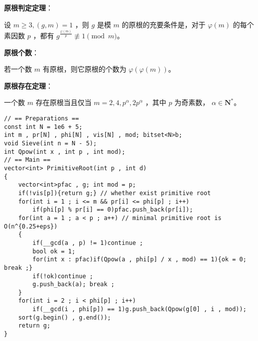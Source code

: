 \begin{tcolorbox}
\textbf{原根判定定理}：

设 $m \ge 3, (g,m)=1$ ，则 $g$ 是模 $m$ 的原根的充要条件是，对于 $\varphi(m)$ 的每个素因数 $p$ ，都有
$g^{\frac{\varphi(m)}{p}}\not\equiv 1\pmod m$。
\end{tcolorbox}


\begin{tcolorbox}
\textbf{原根个数}：

若一个数 $m$ 有原根，则它原根的个数为 $\varphi(\varphi(m))$。
\end{tcolorbox}


\begin{tcolorbox}
\textbf{原根存在定理}：

一个数 $m$ 存在原根当且仅当 $m=2,4,p^{\alpha},2p^{\alpha}$ ，其中 $p$ 为奇素数， $\alpha\in \mathbf{N}^{*}$。
\end{tcolorbox}

\begin{verbatim}
// == Preparations ==
const int N = 1e6 + 5; 
int m , pr[N] , phi[N] , vis[N] , mod; bitset<N>b;
void Sieve(int n = N - 5);
int Qpow(int x , int p , int mod);
// == Main ==
vector<int> PrimitiveRoot(int p , int d)
{
    vector<int>pfac , g; int mod = p;
    if(!vis[p]){return g;} // whether exist primitive root
    for(int i = 1 ; i <= m && pr[i] <= phi[p] ; i++)
        if(phi[p] % pr[i] == 0)pfac.push_back(pr[i]);
    for(int a = 1 ; a < p ; a++) // minimal primitive root is O(n^{0.25+eps})
    {
        if(__gcd(a , p) != 1)continue ;
        bool ok = 1;
        for(int x : pfac)if(Qpow(a , phi[p] / x , mod) == 1){ok = 0; break ;}
        if(!ok)continue ;
        g.push_back(a); break ;
    }
    for(int i = 2 ; i < phi[p] ; i++)
        if(__gcd(i , phi[p]) == 1)g.push_back(Qpow(g[0] , i , mod));
    sort(g.begin() , g.end());
    return g;
}
\end{verbatim}